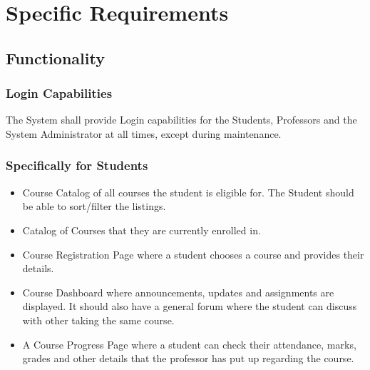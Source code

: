 \documentclass[12pt, a4]{report}
\begin{document}

\chapter{Specific Requirements}


\section{Functionality}

\subsection{Login Capabilities}
The System shall provide Login capabilities for the Students, Professors and the System Administrator at all times, except during maintenance.

\subsection{Specifically for Students}
\begin{itemize}
    \item Course Catalog  of all courses the student is eligible for. The Student should be able to sort/filter the listings.
    \item Catalog of Courses that they are currently enrolled in.
    \item Course Registration Page where a student chooses a course and provides their details.
    \item Course Dashboard where announcements, updates and assignments are displayed. It should also have a general forum where the student can discuss with other taking the same course.
    \item A Course Progress Page where a student can check their attendance, marks, grades and other details that the professor has put up regarding the course.
\end{itemize}
\end{document}
